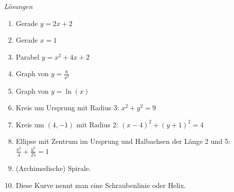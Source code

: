 \clearpage
\emph{Lösungen}
\begin{enumerate}
    \item Gerade \(y=2x+2\)
    \item Gerade \(x=1\)
    \item Parabel \(y= x^2+4x+2\)
    \item Graph von \(y=\frac{8}{x^2}\)
    \item Graph von \(y=\ln(x)\)
    \item Kreis um Ursprung mit Radius 3: \(x^2+y^2=9\)
    \item Kreis um \((4, -1)\) mit Radius 2: \((x-4)^2+(y+1)^2=4\)
    \item Ellipse mit Zentrum im Ursprung und Halbachsen der Länge 2 und 5: \(\frac{x^2}{4} + \frac{y^2}{25} = 1\)
    \item (Archimedische) Spirale.
    \item Diese Kurve nennt man eine Schraubenlinie oder Helix.
\end{enumerate}
